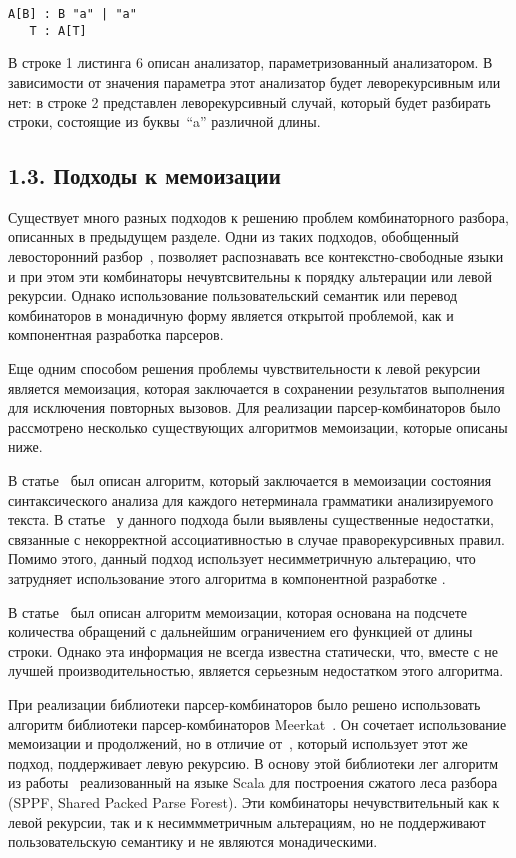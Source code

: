 \begin{lstlisting}[basicstyle=\small, caption=Левая рекурсия]
   A[B] : B "a" | "a"
   T : A[T]
\end{lstlisting}

В строке 1 листинга 6 описан анализатор, параметризованный анализатором. В зависимости от значения параметра этот анализатор будет леворекурсивным или нет: в строке 2 представлен леворекурсивный случай, который будет разбирать строки, состоящие из буквы~``a'' различной длины.

\subsection*{1.3. Подходы к мемоизации}
Существует много разных подходов к решению проблем комбинаторного разбора, описанных в предыдущем разделе. Одни из таких подходов, обобщенный левосторонний разбор~\cite{GLLcomb}, позволяет распознавать все контекстно-свободные языки и при этом эти комбинаторы нечувтсвительны к порядку альтерации или левой рекурсии. Однако использование пользовательский семантик или перевод комбинаторов в монадичную форму является открытой проблемой, как и компонентная разработка парсеров.

Еще одним способом решения проблемы чувствительности к левой рекурсии является мемоизация, которая заключается в сохранении результатов выполнения для исключения повторных вызовов. Для реализации парсер-комбинаторов было рассмотрено несколько существующих алгоритмов мемоизации, которые описаны ниже.

В статье~\cite{warth} был описан алгоритм, который заключается в мемоизации состояния синтаксического анализа для каждого нетерминала грамматики анализируемого текста. В статье~\cite{tratt} у данного подхода были выявлены существенные недостатки, связанные с некорректной ассоциативностью в случае праворекурсивных правил. Помимо этого, данный подход использует несимметричную альтерацию, что затрудняет использование этого алгоритма в компонентной разработке .

В статье~\cite{frost} был описан алгоритм мемоизации, которая основана на подсчете количества обращений с дальнейшим ограничением его функцией от длины строки. Однако эта информация не всегда известна статически, что, вместе с не лучшей производительностью, является серьезным недостатком этого алгоритма.

При реализации библиотеки парсер-комбинаторов было решено использовать алгоритм библиотеки парсер-комбинаторов Meerkat~\cite{meerkat}. Он сочетает использование мемоизации и продолжений, но в отличие от~\cite{swierstra2001combinator}, который использует этот же подход, поддерживает левую рекурсию. В основу этой библиотеки лег алгоритм из работы~\cite{memo} реализованный на языке Scala для построения сжатого леса разбора (SPPF, Shared Packed Parse Forest). Эти комбинаторы нечувствительный как к левой рекурсии, так и к несиммметричным альтерациям, но не поддерживают пользовательскую семантику и не являются монадическими.

